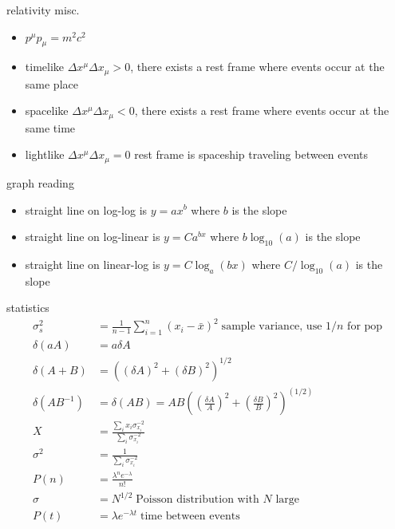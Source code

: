 \documentclass[avery5388, frame, grid]{flashcards}
\begin{document}
\begin{flashcard}{relativity misc.}
  {
    \begin{itemize}
    \item $p^{\mu}p_{\mu} = m^{2}c^{2}$
    \item timelike $\Delta x^{\mu} \Delta x_{\mu} > 0$, there exists a rest frame where events occur at the same place
    \item spacelike $\Delta x^{\mu} \Delta x_{\mu} < 0$, there exists a rest frame where events occur at the same time
    \item lightlike $\Delta x^{\mu} \Delta x_{\mu} = 0$ rest frame is spaceship traveling between events
    \end{itemize}
  }
\end{flashcard}


\begin{flashcard}{graph reading}
  {
    \begin{itemize}
    \item straight line on log-log is $y = ax^{b}$ where $b$ is the slope
    \item straight line on log-linear is $y = C a^{bx}$ where $b \log_{10}(a)$ is the slope
    \item straight line on linear-log is $y = C\log_{a}(bx)$ where $C / \log_{10}(a)$ is the slope
    \end{itemize}
  }
\end{flashcard}

\begin{flashcard}{statistics}
  {
    \begin{align*}
      \sigma_{s}^{2} &= \frac{1}{n - 1} \sum_{i = 1}^{n} (x_{i} - \bar{x})^{2} \; \textrm{sample variance, use $1/n$ for pop}\\
      \delta(a A) &= a \delta A\\
      \delta(A + B) &= ((\delta A)^{2} + (\delta B)^{2})^{1/2}\\
      \delta(AB^{-1}) & = \delta(AB) = AB ((\frac{\delta A}{A})^{2} + (\frac{\delta B}{B})^{2})^(1/2)\\
      X &= \frac{\sum_{i} x_{i} \sigma_{x_{i}}^{-2}}{\sum_{i} \sigma_{x_{i}}^{-2}}\\
      \sigma^{2} &= \frac{1}{\sum_{i} \sigma_{x_{i}}^{-2}}\\
      P(n) &= \frac{\lambda^{n}e^{- \lambda}}{n!}\\
      \sigma &= N^{1/2} \; \textrm{Poisson distribution with $N$ large}\\
      P(t) &= \lambda e^{- \lambda t} \; \textrm{time between events}
    \end{align*}
  }
\end{flashcard}
\end{document}
